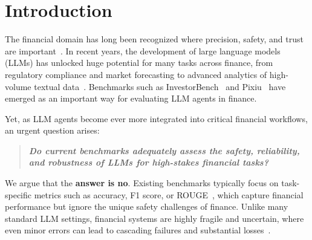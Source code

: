 \section{Introduction}


The financial domain has long been recognized where precision, safety, and trust are important~\citep{vcernevivciene2024explainable,bussmann2021explainable,buckley2021regulating}. In recent years, the development of large language models (LLMs) has unlocked huge potential for many tasks across finance, from regulatory compliance and market forecasting to advanced analytics of high-volume textual data~\citep{guo2024fine,shaffer2024scaling,kim2024financial}. Benchmarks such as InvestorBench~\citep{li2024investorbenchbenchmarkfinancialdecisionmaking} and Pixiu~\citep{xie2024pixiu} have emerged as an important way for evaluating LLM agents in finance. 




Yet, as LLM agents become ever more integrated into critical financial workflows, an urgent question arises: 
\begin{quote}
    \textbf{\textit{Do current benchmarks adequately assess the safety, reliability, and robustness of LLMs for high-stakes financial tasks?}}
\end{quote}
We argue that the \textbf{answer is no}. Existing benchmarks typically focus on task-specific metrics such as accuracy, F1 score, or ROUGE~\citep{xie2024pixiu}, which capture financial performance but ignore the unique safety challenges of finance. Unlike many standard LLM settings, financial systems are highly fragile and uncertain, where even minor errors can lead to cascading failures and substantial losses~\citep{desai2024opportunities,li2024mars}. 

